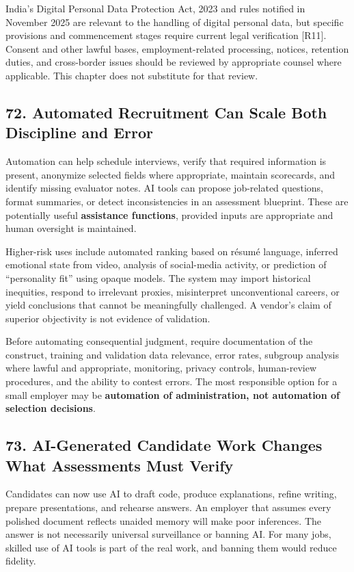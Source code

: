 India's Digital Personal Data Protection Act, 2023 and rules notified in November 2025 are relevant to the handling of digital personal data, but specific provisions and commencement stages require current legal verification [R11]. Consent and other lawful bases, employment-related processing, notices, retention duties, and cross-border issues should be reviewed by appropriate counsel where applicable. This chapter does not substitute for that review.

\subsection*{72. Automated Recruitment Can Scale Both Discipline and Error}

Automation can help schedule interviews, verify that required information is present, anonymize selected fields where appropriate, maintain scorecards, and identify missing evaluator notes. AI tools can propose job-related questions, format summaries, or detect inconsistencies in an assessment blueprint. These are potentially useful \textbf{assistance functions}, provided inputs are appropriate and human oversight is maintained.

Higher-risk uses include automated ranking based on résumé language, inferred emotional state from video, analysis of social-media activity, or prediction of ``personality fit'' using opaque models. The system may import historical inequities, respond to irrelevant proxies, misinterpret unconventional careers, or yield conclusions that cannot be meaningfully challenged. A vendor's claim of superior objectivity is not evidence of validation.

Before automating consequential judgment, require documentation of the construct, training and validation data relevance, error rates, subgroup analysis where lawful and appropriate, monitoring, privacy controls, human-review procedures, and the ability to contest errors. The most responsible option for a small employer may be \textbf{automation of administration, not automation of selection decisions}.

\subsection*{73. AI-Generated Candidate Work Changes What Assessments Must Verify}

Candidates can now use AI to draft code, produce explanations, refine writing, prepare presentations, and rehearse answers. An employer that assumes every polished document reflects unaided memory will make poor inferences. The answer is not necessarily universal surveillance or banning AI. For many jobs, skilled use of AI tools is part of the real work, and banning them would reduce fidelity.

